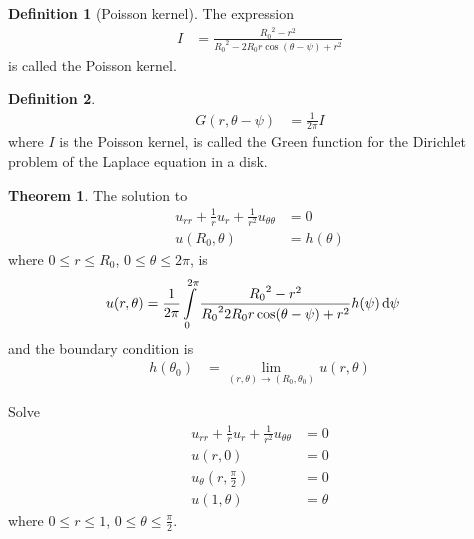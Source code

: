 \documentclass[titlepage, fleqn, a4paper, 12pt, twoside]{article}
\theoremstyle{definition}
\newtheorem{definition}{Definition}
\theoremstyle{theorem}
\newtheorem{theorem}{Theorem}
\begin{document}
\begin{definition}[Poisson kernel]
	The expression
	\begin{align*}
		I & = \frac{{R_0}^2 - r^2}{{R_0}^2 - 2 R_0 r \cos(\theta - \psi) + r^2}
	\end{align*}
	is called the Poisson kernel.
\end{definition}

\begin{definition}
	\begin{align*}
		G(r,\theta - \psi) & = \frac{1}{2 \pi} I
	\end{align*}
	where $I$ is the Poisson kernel, is called the Green function for the Dirichlet problem of the Laplace equation in a disk.
\end{definition}

\begin{theorem}
	The solution to 
	\begin{align*}
		u_{r r} + \frac{1}{r} u_r + \frac{1}{r^2} u_{\theta \theta} & = 0 \\
		u(R_0,\theta)                                               & = h(\theta)
	\end{align*}
	where $0 \le r \le R_0$, $0 \le \theta \le 2 \pi$, is
	\begin{align*}
		u(r,\theta) & = \frac{1}{2 \pi} \int\limits_{0}^{2 \pi} \frac{{R_0}^2 - r^2}{{R_0}^2 2 R_0 r \cos(\theta - \psi) + r^2} h(\psi) \dif \psi
	\end{align*}
	and the boundary condition is
	\begin{align*}
		h(\theta_0) & = \lim\limits_{(r,\theta) \to (R_0,\theta_0)} u(r,\theta)
	\end{align*}
\end{theorem}

\begin{question}
	Solve
	\begin{align*}
		u_{r r} + \frac{1}{r} u_{r} + \frac{1}{r^2} u_{\theta \theta} & = 0 \\
		u(r,0)                                                        & = 0 \\
		u_{\theta}\left( r,\frac{\pi}{2} \right)                      & = 0 \\
		u(1,\theta)                                                   & = \theta
	\end{align*}
	where $0 \le r \le 1$, $0 \le \theta \le \frac{\pi}{2}$.
\end{question}
\end{document}
